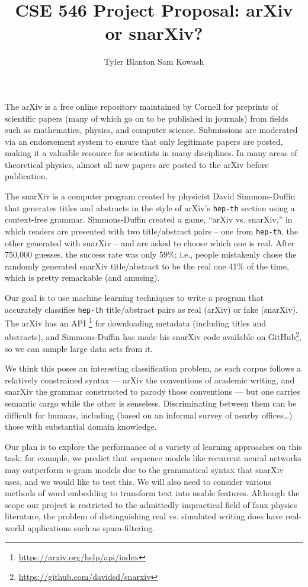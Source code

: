 \documentclass[11pt,letterpaper]{article}
\author{Tyler Blanton \quad Sam Kowash}
\title{CSE 546 Project Proposal: arXiv or snarXiv?}
\numberwithin{equation}{section}
\numberwithin{figure}{section}
\begin{document}
\maketitle
The arXiv is a free online repository maintained by Cornell for preprints of scientific papers (many of which go on to be published in journals) from fields such as mathematics, physics, and computer science.
Submissions are moderated via an endorsement system to ensure that only legitimate papers are posted, making it a valuable resource for scientists in many disciplines. In many areas of theoretical physics, almost all new papers are posted to the arXiv before publication.

The snarXiv is a computer program created by physicist David Simmons-Duffin that generates titles and abstracts in the style of arXiv's \texttt{hep-th} section using a context-free grammar.
Simmons-Duffin created a game, ``arXiv vs. snarXiv,'' in which readers are presented with two title/abstract pairs -- one from \texttt{hep-th}, the other generated with snarXiv -- and are asked to choose which one is real.
After 750,000 guesses, the success rate was only 59\%; i.e., people mistakenly chose the randomly generated snarXiv title/abstract to be the real one 41\% of the time, which is pretty remarkable (and amusing).

Our goal is to use machine learning techniques to write a program that accurately classifies \texttt{hep-th} title/abstract pairs as real (arXiv) or fake (snarXiv).
The arXiv has an API%
\footnote{\url{https://arxiv.org/help/api/index}}
for downloading metadata (including titles and abstracts), and Simmons-Duffin has made his snarXiv code available on GitHub\footnote{\url{https://github.com/davidsd/snarxiv}}, so we can sample large data sets from it.
%

We think this poses an interesting classification problem, as each corpus follows a relatively constrained syntax --- arXiv the conventions of academic writing, and snarXiv the grammar constructed to parody those conventions --- but one carries semantic cargo while the other is senseless. Discriminating between them can be difficult for humans, including (based on an informal survey of nearby offices\ldots) those with substantial domain knowledge.

Our plan is to explore the performance of a variety of learning approaches on this task; for example, we predict that sequence models like recurrent neural networks may outperform $n$-gram models due to the grammatical syntax that snarXiv uses, and we would like to test this. 
We will also need to consider various methods of word embedding to transform text into usable features.
Although the scope our project is restricted to the admittedly impractical field of faux physics literature, the problem of distinguishing real vs. simulated writing does have real-world applications such as spam-filtering. 
\end{document}
